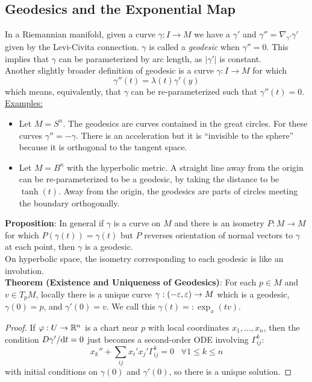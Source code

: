 \documentclass{amsart}
\begin{document}
	\subsection{Geodesics and the Exponential Map} In a Riemannian manifold, given a curve $\gamma:I\to M$ we have a $\gamma'$ and $\gamma''=\nabla_{\gamma'}\gamma'$ given by the Levi-Civita connection. $\gamma$ is called a \textit{geodesic} when $\gamma''=0$. This implies that $\gamma$ can be parameterized by arc length, as $|\gamma'|$ is constant. \\
	
	Another slightly broader definition of geodesic is a curve $\gamma:I\to M$ for which
	$$
	\gamma''(t) = \lambda(t) \gamma'(y)
	$$
	which means, equivalently, that $\gamma$ can be re-parameterized such that $\gamma''(t)=0$.\\
	
	\underline{Examples:}
	\begin{itemize}
		\item Let $M=S^n$. The geodesics are curves contained in the great circles. For these curves $\gamma'' = -\gamma$. There is an acceleration but it is ``invisible to the sphere'' because it is orthogonal to the tangent space.
		\item Let $M=B^n$ with the hyperbolic metric. A straight line away from the origin can be re-parameterized to be a geodesic, by taking the distance to be $\tanh(t)$. Away from the origin, the geodesics are parts of circles meeting the boundary orthogonally.\\
	\end{itemize}
	
	\textbf{Proposition}: In general if $\gamma$ is a curve on $M$ and there is an isometry $P:M\to M$ for which $P(\gamma(t))=\gamma(t)$ but $P$ reverses orientation of normal vectors to $\gamma$ at each point, then $\gamma$ is a geodesic.\\
	
	On hyperbolic space, the isometry corresponding to each geodesic is like an involution.\\
	
	\textbf{Theorem (Existence and Uniqueness of Geodesics)}: For each $p\in M$ and $v\in T_pM$, locally there is a unique curve $\gamma:(-\varepsilon,\varepsilon)\to M$ which is a geodesic, $\gamma(0)=p$, and $\gamma'(0)=v$. We call this $\gamma(t)=: \exp_x(tv)$.
	\begin{proof}
		If $\varphi:U\to \mathbb{R}^n$ is a chart near $p$ with local coordinates $x_1,\dots,x_n$, then the condition $D\gamma'/\textrm{d} t=0$ just becomes a second-order ODE involving $\Gamma^k_{ij}$:
		$$
		x_k'' + \sum_{ij}x_i'x_j' \Gamma^k_{ij} = 0 \;\;\; \forall 1\leq k \leq n
		$$
		with initial conditions on $\gamma(0)$ and $\gamma'(0)$, so there is a unique solution.
	\end{proof}\\
	
\end{document}
